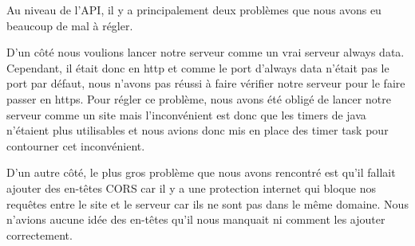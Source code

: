 \begin{flushleft}
Au niveau de l'API, il y a principalement deux problèmes que nous avons eu beaucoup de mal à régler.
\end{flushleft}

\begin{flushleft}
D'un côté nous voulions lancer notre serveur comme un vrai serveur always data. Cependant, il était donc en http et comme le port d'always data n'était pas le port par défaut, nous n'avons pas réussi à faire vérifier notre serveur pour le faire passer en https. Pour régler ce problème, nous avons été obligé de lancer notre serveur comme un site mais l'inconvénient est donc que les timers de java n'étaient plus utilisables et nous avions donc mis en place des timer task pour contourner cet inconvénient.
\end{flushleft}

\begin{flushleft}
D'un autre côté, le plus gros problème que nous avons rencontré est qu'il fallait ajouter des en-têtes CORS car il y a une protection internet qui bloque nos requêtes entre le site et le serveur car ils ne sont pas dans le même domaine. Nous n'avions aucune idée des en-têtes qu'il nous manquait ni comment les ajouter correctement.
\end{flushleft}

